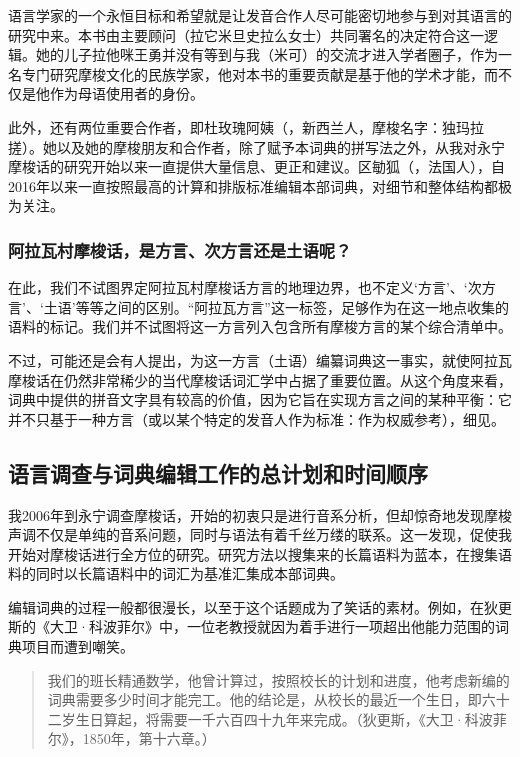 语言学家的一个永恒目标和希望就是让发音合作人尽可能密切地参与到对其语言的研究中来。本书由主要顾问（拉它米旦史拉么女士）共同署名的决定符合这一逻辑。她的儿子拉他咪王勇并没有等到与我（米可）的交流才进入学者圈子，作为一名专门研究摩梭文化的民族学家，他对本书的重要贡献是基于他的学术才能，而不仅是他作为母语使用者的身份。

此外，还有两位重要合作者，即杜玫瑰阿姨（，新西兰人，摩梭名字：独玛拉搓）。她以及她的摩梭朋友和合作者，除了赋予本词典的拼写法之外，从我对永宁摩梭话的研究开始以来一直提供大量信息、更正和建议。区勄狐（，法国人），自2016年以来一直按照最高的计算和排版标准编辑本部词典，对细节和整体结构都极为关注。

\subsubsection*{阿拉瓦村摩梭话，是方言、次方言还是土语呢？}

在此，我们不试图界定阿拉瓦村摩梭话方言的地理边界，也不定义‘方言’、‘次方言’、‘土语’等等之间的区别。“阿拉瓦方言”这一标签，足够作为在这一地点收集的语料的标记。我们并不试图将这一方言列入包含所有摩梭方言的某个综合清单中。

不过，可能还是会有人提出，为这一方言（土语）编纂词典这一事实，就使阿拉瓦摩梭话在仍然非常稀少的当代摩梭话词汇学中占据了重要位置。从这个角度来看，词典中提供的拼音文字具有较高的价值，因为它旨在实现方言之间的某种平衡：它并不只基于一种方言（或以某个特定的发音人作为标准：作为权威参考），细见\textcite{dobbs_ortho_2018}。

\subsection{语言调查与词典编辑工作的总计划和时间顺序}

我2006年到永宁调查摩梭话，开始的初衷只是进行音系分析，但却惊奇地发现摩梭声调不仅是单纯的音系问题，同时与语法有着千丝万缕的联系。这一发现，促使我开始对摩梭话进行全方位的研究。研究方法以搜集来的长篇语料为蓝本，在搜集语料的同时以长篇语料中的词汇为基准汇集成本部词典。

编辑词典的过程一般都很漫长，以至于这个话题成为了笑话的素材。例如，在狄更斯的《大卫·科波菲尔》中，一位老教授就因为着手进行一项超出他能力范围的词典项目而遭到嘲笑。
\begin{quotation}
    我们的班长精通数学，他曾计算过，按照校长的计划和进度，他考虑新编的词典需要多少时间才能完工。他的结论是，从校长的最近一个生日，即六十二岁生日算起，将需要一千六百四十九年来完成。（狄更斯，《大卫·科波菲尔》，1850年，第十六章。）
\end{quotation}

